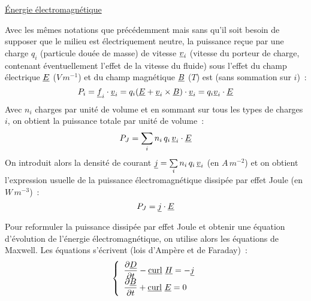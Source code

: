 \underline{\'Energie \'electromagn\'etique}
\nopagebreak

Avec les m\^emes notations que pr\'ec\'edemment mais sans qu'il soit
besoin de supposer que le milieu est \'electriquement neutre,
la puissance re\c cue par une charge $q_i$ (particule dou\'ee de masse)
de vitesse $\underline{v}_i$ (vitesse du porteur de charge, contenant \'eventuellement
l'effet de la vitesse du fluide) sous l'effet
du champ \'electrique $\underline{E}$ ($V\,m^{-1}$)
et du champ magn\'etique  $\underline{B}$ ($T$) est (sans
sommation sur $i$)~:
\begin{equation}
P_i=\underline{f}_i\cdot\underline{v}_i=
q_i(\underline{E}+\underline{v}_i\times\underline{B})\cdot\underline{v}_i
= q_i\underline{v}_i\cdot\underline{E}
\end{equation}
Avec $n_i$ charges par unit\'e de volume et en sommant sur tous les types
de charges $i$, on obtient la puissance totale par unit\'e de volume~:
\begin{equation}
P_J=
\sum\limits_i n_i\,q_i\,\underline{v}_i\cdot\underline{E}
\end{equation}
On introduit alors la densit\'e de courant $\underline{j}=\sum\limits_i n_i\,q_i\,\underline{v}_i$ (en $A\,m^{-2}$) et on obtient l'expression usuelle de la puissance
\'electromagn\'etique dissip\'ee par effet Joule (en $W\,m^{-3}$)~:
\begin{equation}
P_J=\underline{j}\cdot\underline{E}
\end{equation}

Pour reformuler la puissance dissip\'ee par effet Joule et obtenir
une \'equation d'\'evolution de l'\'energie \'electromagn\'etique, on utilise
alors les \'equations de Maxwell.
Les \'equations s'\'ecrivent (lois d'Amp\`ere
et de Faraday)~:
\begin{equation}
\left\{
\begin{array}{l}
\displaystyle\frac{\partial \underline{D}}{\partial t} - \underline{\text{curl}}\ \underline{H} = -\underline{j}\\
\displaystyle\frac{\partial \underline{B}}{\partial t} + \underline{\text{curl}}\ \underline{E} = 0
\end{array}
\right.
\end{equation}

